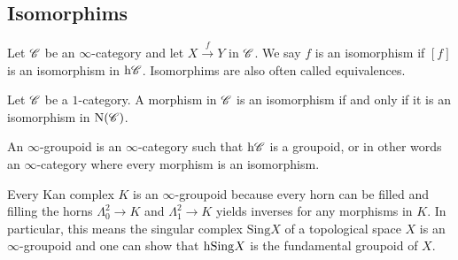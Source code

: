 \documentclass[../../thesis.tex]{subfiles}
\begin{document}
\subsection{Isomorphims}
\begin{definition}
    Let $\mathscr{C}$ be an $\infty$-category and let $X\xrightarrow{f}Y$ in $\mathscr{C}$.
    We say $f$ is an isomorphism if $[f]$ is an isomorphism in $\mathrm{h}\mathscr{C}$.
    Isomorphims are also often called equivalences.
\end{definition}
\begin{example}
    Let $\mathscr{C}$ be a $1$-category.
    A morphism in $\mathscr{C}$ is an isomorphism if and only if it is an isomorphism in $\mathrm{N}(\mathscr{C})$.
\end{example}
\begin{definition}
    An $\infty$-groupoid is an $\infty$-category such that $\mathrm{h}\mathscr{C}$ is a groupoid, or in other words an $\infty$-category where every morphism is an isomorphism.
\end{definition}
\begin{example}
    Every Kan complex $K$ is an $\infty$-groupoid because every horn can be filled and filling the horns $\Lambda_0^2 \to K$ and $\Lambda_1^2 \to K$ yields inverses for any morphisms in $K$.
    \newline
    In particular, this means the singular complex $\mathrm{Sing}X$ of a topological space $X$ is an $\infty$-groupoid and one can show that $\mathrm{h}\mathrm{Sing}X$ is the fundamental groupoid of $X$.
\end{example}
\end{document}
